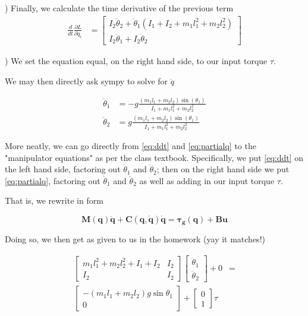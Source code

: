 \documentclass[conference]{IEEEtran}
\begin{document}
) Finally, we calculate the time derivative of the previous term
\begin{align}
    \frac{d}{dt} \frac{\partial L}{\partial \dot q_i} &=
    \begin{bmatrix}
    I_2 \ddot\theta_2 + \ddot\theta_1 ( I_1 +  I_2 +  m_1 l_1^2 + m_2 l_2^2) \\
    I_2 \ddot\theta_1 + I_2 \ddot\theta_2
    \end{bmatrix}
    \label{eq:ddt}
\end{align}

) We set the equation equal, on the right hand side, to our input torque $\tau$.

We may then directly ask sympy to solve for $\ddot q$

\begin{align}
    \ddot \theta_1 &= -g \frac{ (m_1 l_1 + m_2 l_2) \sin(\theta_1)}
        {I_1 + m_1 l_1^2 + m_2 l_2^2} \\
    \ddot \theta_2 &= g \frac{ (m_1 l_1 + m_2 l_2) \sin(\theta_1) }
        {I_1 + m_1 l_1^2 + m_2 l_2^2}
\end{align}

More neatly, we can go directly from \cref{eq:ddt} and
\cref{eq:partialq} to the "manipulator equations" as per the class textbook.
Specifically, we put \cref{eq:ddt} on the left hand side, factoring out
$\ddot \theta_1$ and $\ddot \theta_2$; then on the right hand side we put
\cref{eq:partialq}, factoring out $\dot \theta_1$ and $\dot \theta_2$ as well as
adding in our input torque $\tau$.

That is, we rewrite in form

\begin{equation}
\bm{M(q) \ddot q + C (q, \dot q) \dot q = \tau_g (q) + B u}
\end{equation}

Doing so, we then get as given to us in the homework
(yay it matches!)

\begin{align}
    \begin{bmatrix}
        m_1 l_1 ^2 + m_2 l_2^2 + I_1 + I_2 & I_2 \\
        I_2 & I_2
    \end{bmatrix}
    \begin{bmatrix}
        \ddot \theta_1 \\
        \ddot \theta_2
    \end{bmatrix}
    + 0
    &= \nonumber \\
    \begin{bmatrix}
        - (m_1 l_1 + m_2 l_2) g \sin\theta_1 \\
        0
    \end{bmatrix}
     +
     \begin{bmatrix}
         0 \\
         1
     \end{bmatrix}
     \tau
\end{align}
\end{document}

